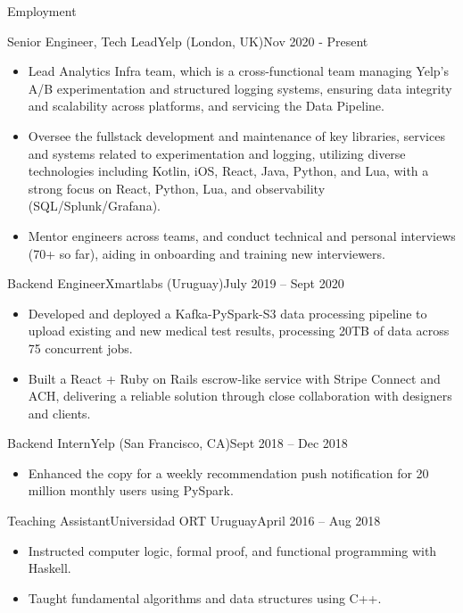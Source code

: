 \documentclass[]{mcdowellcv}
\begin{document}
	\makeheader
	
	\begin{cvsection}{Employment}
		\begin{cvsubsection}{Senior Engineer, Tech Lead}{Yelp (London, UK)}{Nov 2020 - Present}	
			\begin{itemize}
				\item Lead Analytics Infra team, which is a cross-functional team managing Yelp's A/B experimentation and structured logging systems, ensuring data integrity and scalability across platforms, and servicing the Data Pipeline.
				\item Oversee the fullstack development and maintenance of key libraries, services and systems related to experimentation and logging, utilizing diverse technologies including Kotlin, iOS, React, Java, Python, and Lua, with a strong focus on React, Python, Lua, and observability (SQL/Splunk/Grafana).
				\item Mentor engineers across teams, and conduct technical and personal interviews (70+ so far), aiding in onboarding and training new interviewers.
			\end{itemize}
		\end{cvsubsection}
		
		
		\begin{cvsubsection}{Backend Engineer}{Xmartlabs (Uruguay)}{July 2019 -- Sept 2020}	
			\begin{itemize}
				\item Developed and deployed a Kafka-PySpark-S3 data processing pipeline to upload existing and new medical test results, processing 20TB of data across 75 concurrent jobs.
				\item Built a React + Ruby on Rails escrow-like service with Stripe Connect and ACH, delivering a reliable solution through close collaboration with designers and clients.
			\end{itemize}
		\end{cvsubsection}
		
		\begin{cvsubsection}{Backend Intern}{Yelp (San Francisco, CA)}{Sept 2018 -- Dec 2018}		
			\begin{itemize}
				\item Enhanced the copy for a weekly recommendation push notification for 20 million monthly users using PySpark.
			\end{itemize}
		\end{cvsubsection}

		\begin{cvsubsection}{Teaching Assistant}{Universidad ORT Uruguay}{April 2016 -- Aug 2018}
			\begin{itemize}
				\item Instructed computer logic, formal proof, and functional programming with Haskell.
			    \item Taught fundamental algorithms and data structures using C++.
			\end{itemize}
		\end{cvsubsection}
	\end{cvsection}
	
\end{document}
